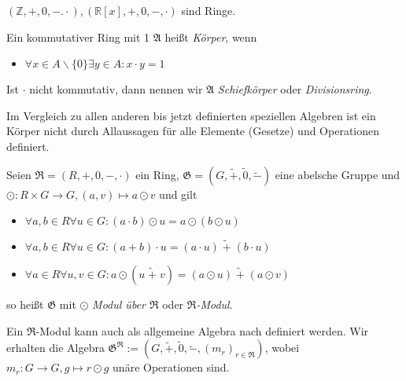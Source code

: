 \begin{example}
    $(\mathbb{Z}, +, 0, -. \cdot), (\mathbb{R}[x], +, 0, -, \cdot)$ sind Ringe.
\end{example}

\begin{definition}
    Ein kommutativer Ring mit 1 $\mathfrak{A}$ heißt \emph{Körper}, wenn 
    \begin{itemize}[topsep=0pt, label={--}]
        \item $\forall x \in A\backslash \{0\} \exists y \in A: x\cdot y = 1$
    \end{itemize}

    Ist $\cdot$ nicht kommutativ, dann nennen wir $\mathfrak{A}$ \emph{Schiefkörper} oder \emph{Divisionsring}.
\end{definition}

\begin{remark}
    Im Vergleich zu allen anderen bis jetzt definierten speziellen Algebren ist ein Körper nicht durch Allaussagen für alle Elemente (Gesetze) und Operationen definiert. 
\end{remark}

\begin{definition}
    Seien $\mathfrak{R} = (R, +, 0, -, \cdot)$ ein Ring, $\mathfrak{G} = (G, \widetilde{+}, \widetilde{0}, \widetilde{-})$ eine abelsche Gruppe und $\odot: R \times G \to G, (a, v) \mapsto a \odot v$ und gilt
    \begin{itemize}[topsep=0pt, label={--}]
        \item $\forall a,b \in R \forall u \in G: (a \cdot b)\odot u = a \odot (b \odot u)$
        \item $\forall a,b \in R \forall u \in G: (a + b) \cdot u = (a \cdot u) \;\widetilde{+}\; (b \cdot u)$
        \item $\forall a \in R \forall u,v \in G: a \odot (u \;\widetilde{+}\; v) = (a \odot u) \;\widetilde{+}\; (a \odot v)$
    \end{itemize}
    so heißt $\mathfrak{G}$ mit $\odot$ \emph{Modul über $\mathfrak{R}$} oder \emph{$\mathfrak{R}$-Modul}.

    Ein $\mathfrak{R}$-Modul kann auch als allgemeine Algebra nach  definiert werden. Wir erhalten die Algebra $\mathfrak{G}^\mathfrak{R} := (G, \widetilde{+}, \widetilde{0}, \widetilde{-}, (m_r)_{r \in \mathfrak{R}})$, wobei $m_r: G \to G, g \mapsto r \odot g$ unäre Operationen sind.
\end{definition}

